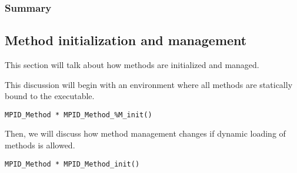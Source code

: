 





\subsubsection{Summary}



\subsection{Method initialization and management}

This section will talk about how methods are initialized and managed.

This discussion will begin with an environment where all methods are
statically bound to the executable.

\begin{verbatim}
MPID_Method * MPID_Method_%M_init()
\end{verbatim}

Then, we will discuss how method management changes if dynamic
loading of methods is allowed.

\begin{verbatim}
MPID_Method * MPID_Method_init()
\end{verbatim}

